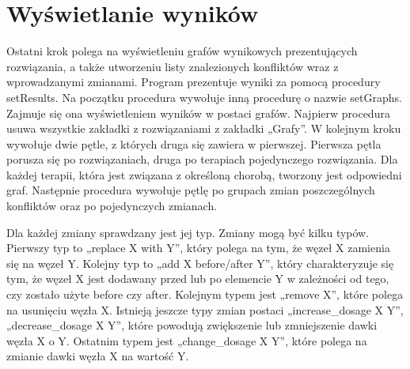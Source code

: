 \section{Wyświetlanie wyników}
Ostatni krok polega na wyświetleniu grafów wynikowych prezentujących rozwiązania, a także utworzeniu listy znalezionych konfliktów wraz z wprowadzanymi zmianami.
Program prezentuje wyniki za pomocą procedury setResults. Na początku procedura wywołuje inną procedurę o nazwie setGraphs. Zajmuje się ona wyświetleniem wyników w postaci grafów. Najpierw procedura usuwa wszystkie zakładki z rozwiązaniami z zakładki „Grafy”. W kolejnym kroku wywołuje dwie pętle, z których druga się zawiera w pierwszej. Pierwsza pętla porusza się po rozwiązaniach, druga po terapiach pojedynczego rozwiązania. Dla każdej terapii, która jest związana z określoną chorobą, tworzony jest odpowiedni graf. Następnie procedura wywołuje pętlę po grupach zmian poszczególnych konfliktów oraz po pojedynczych zmianach. 

Dla każdej zmiany sprawdzany jest jej typ. Zmiany mogą być kilku typów. Pierwszy typ to „replace X with Y”, który polega na tym, że węzeł X zamienia się na węzeł Y. Kolejny typ to „add X before/after Y”, który charakteryzuje się tym, że węzeł X jest dodawany przed lub po elemencie Y w zależności od tego, czy zostało użyte before czy after. Kolejnym typem jest „remove X”, które polega na usunięciu węzła X. Istnieją jeszcze typy zmian postaci „increase\_dosage X Y”, „decrease\_dosage X Y”, które powodują zwiększenie lub zmniejszenie dawki węzła X o Y. Ostatnim typem jest „change\_dosage X Y”, które polega na zmianie dawki węzła X na wartość Y.  

